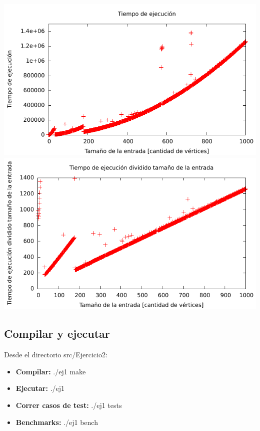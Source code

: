 \includegraphics[width=\textwidth]{ej2/cuadratico.pdf}
\includegraphics[width=\textwidth]{ej2/lineal.pdf}


\subsection{Compilar y ejecutar}
Desde el directorio src/Ejercicio2:
\begin{itemize}
   \item {\bf Compilar:} ./ej1 make
   \item {\bf Ejecutar:} ./ej1
   \item {\bf Correr casos de test:} ./ej1 tests
   \item {\bf Benchmarks:} ./ej1 bench
\end{itemize}
